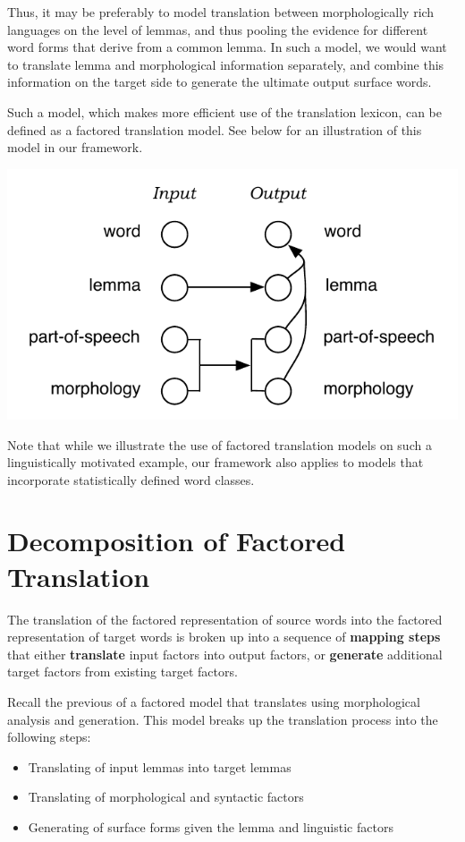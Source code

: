 \documentclass[11pt]{report}
\theoremstyle{plain}
\begin{document}
Thus, it may be preferably to model translation between morphologically rich languages on the level of lemmas, and thus pooling the evidence for different word forms that derive from a common lemma. In such a model, we would want to translate lemma and morphological information separately, and combine this information on the target side to generate the ultimate output surface words.

Such a model, which makes more efficient use of the translation lexicon, can be defined as a factored translation model. See below for an illustration of this model in our framework.

\begin{center}
\includegraphics[scale=0.75]{factored-morphgen-symmetric.pdf}
\end{center}

Note that while we illustrate the use of factored translation models on such a linguistically motivated example, our framework also applies to models that incorporate statistically defined word classes.

\section{Decomposition of Factored Translation}\label{sec:factored-decomposition}
The translation of the factored representation of source words into the factored representation of target words is broken up into a sequence of {\bf mapping steps} that either {\bf translate} input factors into output factors, or {\bf generate} additional target factors from existing target factors.

Recall the previous  of a factored model that translates using morphological analysis and generation. This model breaks up the translation process into the following steps:
\begin{itemize}
\item Translating of input lemmas into target lemmas
\item Translating of morphological and syntactic factors
\item Generating of surface forms given the lemma and linguistic factors
\end{itemize}
\end{document}
